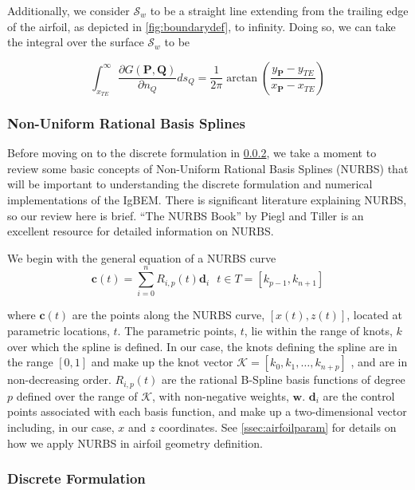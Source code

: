 	Additionally, we consider $\mathcal{S}_w$ to be a straight line extending from the trailing edge of the airfoil, as depicted in \cref{fig:boundarydef}, to infinity. Doing so, we can take the integral over the surface $\mathcal{S}_w$ to be
	
	\begin{equation}
	\label{eqn:wakeintegral}
	\int_{x_{TE}}^{\infty} \frac{\partial G (\mathbf{P},\mathbf{Q})}{\partial n_Q} ds_Q = \frac{1}{2\pi} \arctan\left( \frac{y_{\mathbf{P}} - y_{TE}}{x_{\mathbf{P}}-x_{TE}} \right)
	\end{equation}
	
	
	\subsubsection{Non-Uniform Rational Basis Splines}
	\label{sssec:nurbs}
	Before moving on to the discrete formulation in \cref{sssec:discform}, we take a moment to review some basic concepts of Non-Uniform Rational Basis Splines (NURBS) that will be important to understanding the discrete formulation and numerical implementations of the IgBEM. There is significant literature explaining NURBS, so our review here is brief. ``The NURBS Book'' by Piegl and Tiller is an excellent resource for detailed information on NURBS.\cite{Piegl1997The-NURBS-Book}
	
	We begin with the general equation of a NURBS curve
	\begin{equation}
	\mathbf{c}(t) = \sum_{i=0}^n R_{i,p}(t) \mathbf{d}_i ~~~t\in T = [k_{p-1},k_{n+1}]
	\end{equation}
	
	\noindent where $\mathbf{c}(t)$ are the points along the NURBS curve, $[x(t),z(t)]$, located at parametric locations, $t$. The parametric points, $t$, lie within the range of knots, $k$ over which the spline is defined. In our case, the knots defining the spline are in the range $[0,1]$ and make up the knot vector $\mathbf{\mathcal{K}} = [k_0,k_1,\ldots,k_{n+p}]$ , and are in non-decreasing order. $R_{i,p}(t)$ are the rational B-Spline basis functions of degree $p$ defined over the range of $\mathcal{K}$, with non-negative weights, $\mathbf{w}$. $\mathbf{d}_i$ are the control points associated with each basis function, and make up a two-dimensional vector including, in our case, $x$ and $z$ coordinates. See \cref{ssec:airfoilparam} for details on how we apply NURBS in airfoil geometry definition.
	
	
	\subsubsection{Discrete Formulation}
	\label{sssec:discform}
	
